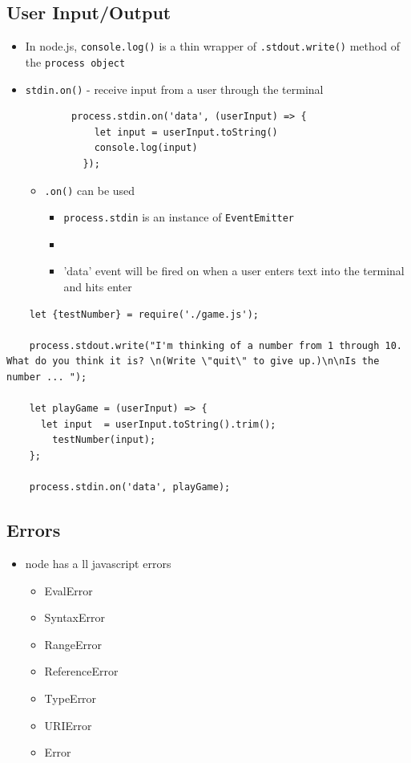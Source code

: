\documentclass[12pt]{article}
\begin{document}
\subsection{User Input/Output}
\begin{itemize}
    \item In node.js, \texttt{console.log()} is a thin wrapper of \texttt{.stdout.write()} method of the \texttt{process object}
    \item \texttt{stdin.on()} - receive input from a user through the terminal

    \begin{lstlisting}
        process.stdin.on('data', (userInput) => {
            let input = userInput.toString()
            console.log(input)
          });
    \end{lstlisting}

    \begin{itemize}
        \item\texttt{.on()} can be used
        \begin{itemize}
            \item \texttt{process.stdin} is an instance of \texttt{EventEmitter}
            \item \item 'data' event will be fired on when a user enters text into the terminal and hits enter
        \end{itemize}
    \end{itemize}
\end{itemize}

\begin{lstlisting}
    let {testNumber} = require('./game.js');

    process.stdout.write("I'm thinking of a number from 1 through 10. What do you think it is? \n(Write \"quit\" to give up.)\n\nIs the number ... ");

    let playGame = (userInput) => {
      let input  = userInput.toString().trim();
        testNumber(input);
    };

    process.stdin.on('data', playGame);
\end{lstlisting}

\subsection{Errors}
\begin{itemize}
    \item node has a ll javascript errors
    \begin{itemize}
        \item EvalError
        \item SyntaxError
        \item RangeError
        \item ReferenceError
        \item TypeError
        \item URIError
        \item Error
    \end{itemize}
\end{itemize}
\end{document}
